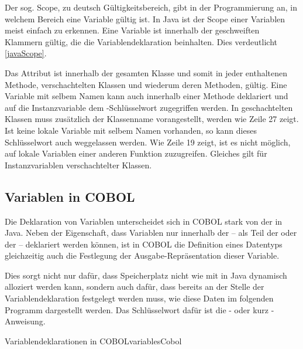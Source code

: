 Der sog. Scope, zu deutsch Gültigkeitsbereich, gibt in der Programmierung an, in welchem Bereich eine Variable gültig ist. In Java ist der Scope einer Variablen meist einfach zu erkennen. Eine Variable ist innerhalb der geschweiften Klammern gültig, die die Variablendeklaration beinhalten. Dies verdeutlicht \autoref{javaScope}.


Das Attribut  ist innerhalb der gesamten Klasse  und somit in jeder enthaltenen Methode, verschachtelten Klassen und wiederum deren Methoden, gültig. Eine Variable mit selbem Namen kann auch innerhalb einer Methode deklariert und auf die Instanzvariable dem -Schlüsselwort zugegriffen werden. In geschachtelten Klassen muss zusätzlich der Klassenname vorangestellt, werden wie Zeile 27 zeigt. Ist keine lokale Variable mit selbem Namen vorhanden, so kann dieses Schlüsselwort auch weggelassen werden. Wie Zeile 19 zeigt, ist es nicht möglich, auf lokale Variablen einer anderen Funktion zuzugreifen. Gleiches gilt für Instanzvariablen verschachtelter Klassen.

\subsection*{Variablen in COBOL}
Die Deklaration von Variablen unterscheidet sich in COBOL stark von der in Java. Neben der Eigenschaft, dass Variablen nur innerhalb der  -- als Teil der  oder der  -- deklariert werden können, ist in COBOL die Definition eines Datentyps gleichzeitig auch die Festlegung der Ausgabe-Repräsentation dieser Variable. 

Dies sorgt nicht nur dafür, dass Speicherplatz nicht wie mit  in Java dynamisch alloziert werden kann, sondern auch dafür, dass bereits an der Stelle der Variablendeklaration festgelegt werden muss, wie diese Daten im folgenden Programm dargestellt werden. Das Schlüsselwort dafür ist die - oder kurz -Anweisung.

\begin{codeWithCaption}{Variablendeklarationen in COBOL}{variablesCobol}
 \cFollow
{}
\end{codeWithCaption}

